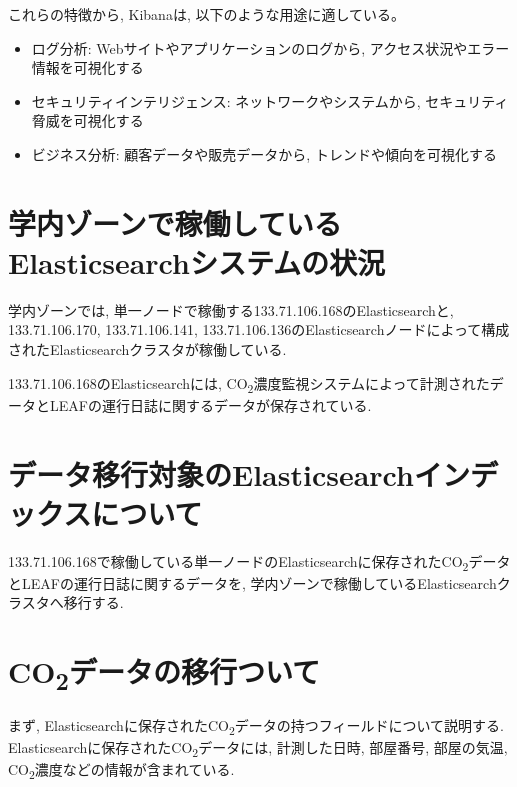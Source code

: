 これらの特徴から, Kibanaは, 以下のような用途に適している。

\begin{itemize}
  \item ログ分析: Webサイトやアプリケーションのログから, アクセス状況やエラー情報を可視化する
  \item セキュリティインテリジェンス: ネットワークやシステムから, セキュリティ脅威を可視化する
  \item ビジネス分析: 顧客データや販売データから, トレンドや傾向を可視化する
\end{itemize}

\section{学内ゾーンで稼働しているElasticsearchシステムの状況}
学内ゾーンでは, 単一ノードで稼働する133.71.106.168のElasticsearchと, 133.71.106.170, 133.71.106.141, 133.71.106.136のElasticsearchノードによって構成されたElasticsearchクラスタが稼働している.

133.71.106.168のElasticsearchには, CO\textsubscript{2}濃度監視システムによって計測されたデータとLEAFの運行日誌に関するデータが保存されている.


\section{データ移行対象のElasticsearchインデックスについて}

133.71.106.168で稼働している単一ノードのElasticsearchに保存されたCO\textsubscript{2}データとLEAFの運行日誌に関するデータを, 学内ゾーンで稼働しているElasticsearchクラスタへ移行する.

\section{CO\textsubscript{2}データの移行ついて}
まず, Elasticsearchに保存されたCO\textsubscript{2}データの持つフィールドについて説明する. Elasticsearchに保存されたCO\textsubscript{2}データには, 計測した日時, 部屋番号, 部屋の気温, CO\textsubscript{2}濃度などの情報が含まれている.


